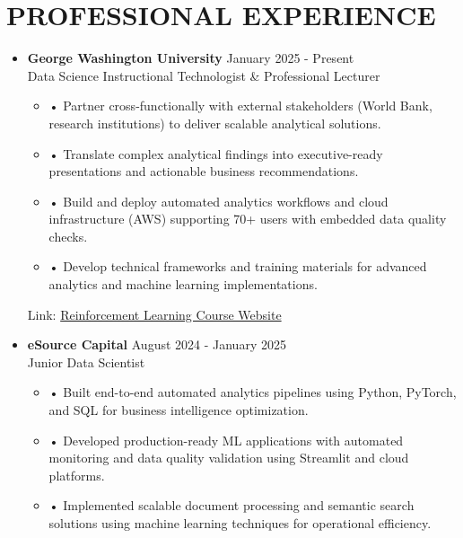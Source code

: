 \documentclass[a4paper,9pt]{extarticle}
\begin{document}

\section*{PROFESSIONAL EXPERIENCE}

\begin{itemize}[leftmargin=0.4cm, label={}]
    \item \textbf{George Washington University} \hfill January 2025 - Present \\
    Data Science Instructional Technologist \& Professional Lecturer
    \vspace{-0.1cm}
    \begin{itemize}[leftmargin=0.3cm, label={}]
    \item \small{•} \normalsize{Partner cross-functionally with external stakeholders (World Bank, research institutions) to deliver scalable analytical solutions.}
    \item \small{•} \normalsize{Translate complex analytical findings into executive-ready presentations and actionable business recommendations.}
    \item \small{•} \normalsize{Build and deploy automated analytics workflows and cloud infrastructure (AWS) supporting 70+ users with embedded data quality checks.}
    \item \small{•} \normalsize{Develop technical frameworks and training materials for advanced analytics and machine learning implementations.}
    \end{itemize}
    Link: \href{https://twallett.com/courses/reinforcement-learning/}{Reinforcement Learning Course Website}
\end{itemize}

\noindent
\begin{itemize}[leftmargin=0.4cm, label={}]
    \item \textbf{eSource Capital} \hfill August 2024 - January 2025 \\
    Junior Data Scientist 
    \vspace{-0.1cm}
    \begin{itemize}[leftmargin=0.3cm, label={}]
    \item \small{•} \normalsize{Built end-to-end automated analytics pipelines using Python, PyTorch, and SQL for business intelligence optimization.}
    \item \small{•} \normalsize{Developed production-ready ML applications with automated monitoring and data quality validation using Streamlit and cloud platforms.}
    \item \small{•} \normalsize{Implemented scalable document processing and semantic search solutions using machine learning techniques for operational efficiency.}
\end{itemize}
\end{itemize}
\end{document}

